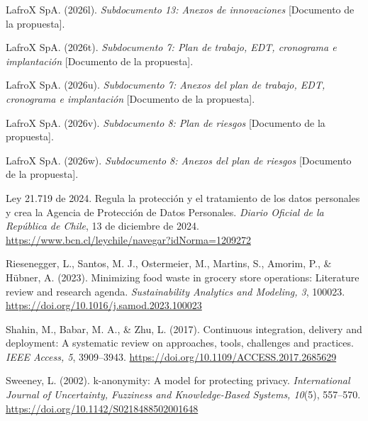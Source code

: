 \begin{list}{}{\setlength{\leftmargin}{1.27cm}\setlength{\itemindent}{-1.27cm}\setlength{\itemsep}{0.4em}\setlength{\parsep}{0pt}}
  \item \begin{samepage}LafroX SpA. (2026l). \emph{Subdocumento 13: Anexos de innovaciones} [Documento de la propuesta].\par\end{samepage}
  \item \begin{samepage}LafroX SpA. (2026t). \emph{Subdocumento 7: Plan de trabajo, EDT, cronograma e implantación} [Documento de la propuesta].\par\end{samepage}
  \item \begin{samepage}LafroX SpA. (2026u). \emph{Subdocumento 7: Anexos del plan de trabajo, EDT, cronograma e implantación} [Documento de la propuesta].\par\end{samepage}
  \item \begin{samepage}LafroX SpA. (2026v). \emph{Subdocumento 8: Plan de riesgos} [Documento de la propuesta].\par\end{samepage}
  \item \begin{samepage}LafroX SpA. (2026w). \emph{Subdocumento 8: Anexos del plan de riesgos} [Documento de la propuesta].\par\end{samepage}
  \item Ley 21.719 de 2024. Regula la protección y el tratamiento de los datos personales y crea la Agencia de Protección de Datos Personales. \emph{Diario Oficial de la República de Chile}, 13 de diciembre de 2024. \url{https://www.bcn.cl/leychile/navegar?idNorma=1209272}
  \item Riesenegger, L., Santos, M. J., Ostermeier, M., Martins, S., Amorim, P., \& Hübner, A. (2023). Minimizing food waste in grocery store operations: Literature review and research agenda. \emph{Sustainability Analytics and Modeling, 3}, 100023. \url{https://doi.org/10.1016/j.samod.2023.100023}
  \item Shahin, M., Babar, M. A., \& Zhu, L. (2017). Continuous integration, delivery and deployment: A systematic review on approaches, tools, challenges and practices. \emph{IEEE Access, 5}, 3909–3943. \url{https://doi.org/10.1109/ACCESS.2017.2685629}
  \item Sweeney, L. (2002). k-anonymity: A model for protecting privacy. \emph{International Journal of Uncertainty, Fuzziness and Knowledge-Based Systems, 10}(5), 557–570. \url{https://doi.org/10.1142/S0218488502001648}
\end{list}
